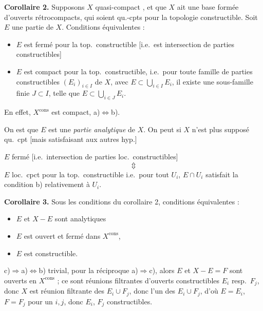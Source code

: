 \documentclass[11pt,a4paper]{article}
\begin{document}
\textbf{Corollaire 2.}  Supposons $X$  quasi-compact , et que  $X$ ait une base formée d'ouverts  rétrocompacts, qui soient qu.-cpts pour la topologie constructible. Soit $E$ une partie de $X$. Conditions équivalentes :
\begin{itemize}
\item[a)] $E$ est fermé pour la top.\ constructible [i.e.\ est intersection  de parties constructibles]
\item[b)] $E$ est compact pour la top.\ constructible, i.e.\ pour toute famille de parties constructibles $(E_i)_{i\in I}$ de $X$, avec $E\subset\bigcup_{i\in I}E_i$, il existe une  sous-famille finie $J\subset I$, telle que $E\subset\bigcup_{i\in J}E_i$.
\end{itemize}

 En effet, $X^{\mathrm{cons}}$ est compact,  a)$\iff$b).

On est   que  $E$ est une \emph{partie analytique} de $X$. On peut \ill{} \ill{} \ill{}  si $X$ n'est plus supposé qu.\ cpt [mais satisfaisant aux autres hyp.]

$E$ fermé  [i.e.\ intersection de parties loc.\ constructibles]
\[
\Updownarrow
\]
$E$ loc.\ cpct pour la top.\ constructible i.e.\ pour tout  $U_i$, $E\cap U_i$ satisfait la condition b) relativement à $U_i$.

\textbf{Corollaire 3.} Sous les conditions du corollaire 2, conditions équivalentes :
\begin{itemize}
\item[a)] $E$ et $X-E$ sont analytiques
\item[b)] $E$ est  ouvert et fermé dans $X^{\mathrm{cons}}$,
\item[c)] $E$ est constructible.
\end{itemize}

c)$\Rightarrow$a)$\iff$b) trivial, pour la réciproque a)$\Rightarrow$c), alors \ill{} $E$ et $X-E=F$ sont ouverts en $X^{\mathrm{cons}}$ ; ce sont réunions \struck{\ill{}} \struck{\ill{}} filtrantes d'ouverts constructibles $E_i$ resp.\ $F_j$, donc $X$ est réunion filtrante des $E_i\cup F_j$, donc  l'un des $E_i\cup F_j$, d'où $E=E_i$,  $F=F_j$ pour un $i,j$, donc $E_i$, $F_j$ constructibles.
\end{document}
